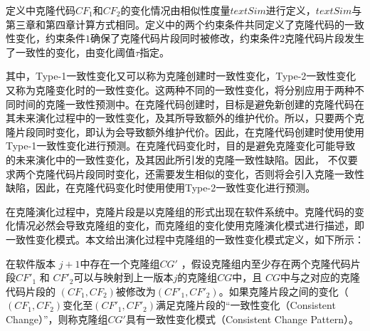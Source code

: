 
定义中克隆代码$ CF_1 $和$ CF_2 $的变化情况由相似性度量$ \mathit {textSim} $进行定义，$textSim$与第三章和第四章计算方式相同。定义中的两个约束条件共同定义了克隆代码的一致性变化，约束条件$1$确保了克隆代码片段同时被修改，约束条件$2$克隆代码片段发生了一致性的变化，由变化阈值$\tau$指定。

其中，Type-1一致性变化又可以称为克隆创建时一致性变化，Type-2一致性变化又称为克隆变化时的一致性变化。这两种不同的一致性变化，将分别应用于两种不同时间的克隆一致性预测中。在克隆代码创建时，目标是避免新创建的克隆代码在其未来演化过程中的一致性变化，及其所导致额外的维护代价。所以，只要两个克隆片段同时变化，即认为会导致额外维护代价。因此，在克隆代码创建时使用使用Type-1一致性变化进行预测。在克隆代码变化时，目的是避免克隆变化可能导致的未来演化中的一致性变化，及其因此所引发的克隆一致性缺陷。因此， 不仅要求两个克隆代码片段同时变化，还需要发生相似的变化，否则将会引入克隆一致性缺陷，因此，在克隆代码变化时使用使用Type-2一致性变化进行预测。

在克隆演化过程中，克隆片段是以克隆组的形式出现在软件系统中。克隆代码的变化情况必然会导致克隆组的变化，而克隆组的变化使用克隆演化模式进行描述，即一致性变化模式。本文给出演化过程中克隆组的一致性变化模式定义，如下所示：


\begin{definition} 
\label{def-changepattern}
在软件版本 $j+1$中存在一个克隆组$CG'$ ，假设克隆组内至少存在两个克隆代码片段$CF'_1$ 和 $CF'_2$可以与映射到上一版本$j$的克隆组$CG$中，且 $CG$中与之对应的克隆代码片段的 $(CF_1,CF_2)$被修改为$(CF'_1,CF'_2)$。如果克隆片段之间的变化（ $(CF_1,CF_2)$变化至$(CF'_1,CF'_2)$满足克隆片段的“一致性变化（Consistent Change）”，则称克隆组$CG'$具有一致性变化模式（Consistent Change Pattern）。
\end{definition}


